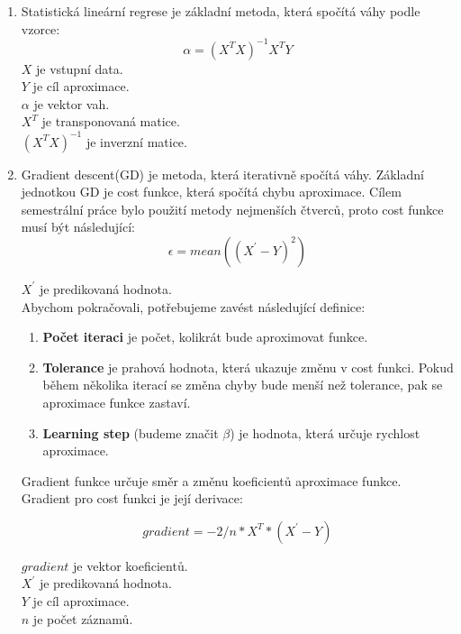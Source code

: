 \documentclass[czech]{pyt-report}
\begin{document}
\begin{enumerate}
\item Statistická lineární regrese je základní metoda, která spočítá váhy podle vzorce\cite{lin_reg}:
\begin{equation}
\alpha = (X^T X)^{-1} X^T Y 
\end{equation}
$X$ je vstupní data. \\
$Y$ je cíl aproximace. \\
$\alpha$ je vektor vah. \\
$X^T$ je transponovaná matice. \\
$(X^T X)^{-1}$ je inverzní matice. \\
\item Gradient descent(GD) je metoda, která  iterativně spočítá váhy. Základní jednotkou GD je cost funkce, která spočítá chybu aproximace. Cílem semestrální práce bylo použití metody nejmenších čtverců, proto cost funkce musí být následující:
\begin{equation}
\epsilon = mean((X^{'} - Y)^2)
\end{equation}

$X^{'}$ je predikovaná hodnota. \\

Abychom pokračovali, potřebujeme zavést následující definice:

\begin{enumerate}
\item \textbf{Počet iteraci} je počet, kolikrát bude aproximovat funkce.
\item \textbf{Tolerance} je prahová hodnota, která ukazuje změnu v cost funkci. Pokud během několika iterací se změna chyby bude menší než tolerance, pak se aproximace funkce zastaví.
\item \textbf{Learning step} (budeme značit $\beta$) je hodnota, která určuje rychlost aproximace.
\end{enumerate}

Gradient funkce určuje směr a změnu koeficientů aproximace funkce. Gradient pro cost funkci je její derivace:

\begin{equation}
gradient = - 2/n *  X^T * (X^{'} - Y)
\end{equation}

$gradient$ je vektor koeficientů. \\
$X^{'}$ je predikovaná hodnota. \\
$Y$ je cíl aproximace. \\
$n$ je počet záznamů. \\


\end{enumerate}
\end{document}
